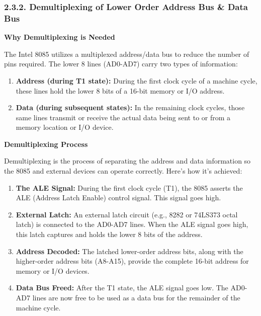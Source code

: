 \documentclass[
]{article}
\begin{document}
\hypertarget{232-demultiplexing-of-lower-order-address-bus--data-bus}{%
\subsubsection{2.3.2. Demultiplexing of Lower Order Address Bus \& Data
Bus}\label{232-demultiplexing-of-lower-order-address-bus--data-bus}}

\textbf{Why Demultiplexing is Needed}

The Intel 8085 utilizes a multiplexed address/data bus to reduce the
number of pins required. The lower 8 lines (AD0-AD7) carry two types of
information:

\begin{enumerate}
\def\labelenumi{\arabic{enumi}.}
\item
  \textbf{Address (during T1 state):} During the first clock cycle of a
  machine cycle, these lines hold the lower 8 bits of a 16-bit memory or
  I/O address.
\item
  \textbf{Data (during subsequent states):} In the remaining clock
  cycles, those same lines transmit or receive the actual data being
  sent to or from a memory location or I/O device.
\end{enumerate}

\textbf{Demultiplexing Process}

Demultiplexing is the process of separating the address and data
information so the 8085 and external devices can operate correctly.
Here's how it's achieved:

\begin{enumerate}
\def\labelenumi{\arabic{enumi}.}
\item
  \textbf{The ALE Signal:} During the first clock cycle (T1), the 8085
  asserts the ALE (Address Latch Enable) control signal. This signal
  goes high.
\item
  \textbf{External Latch:} An external latch circuit (e.g., 8282 or
  74LS373 octal latch) is connected to the AD0-AD7 lines. When the ALE
  signal goes high, this latch captures and holds the lower 8 bits of
  the address.
\item
  \textbf{Address Decoded:} The latched lower-order address bits, along
  with the higher-order address bits (A8-A15), provide the complete
  16-bit address for memory or I/O devices.
\item
  \textbf{Data Bus Freed:} After the T1 state, the ALE signal goes low.
  The AD0-AD7 lines are now free to be used as a data bus for the
  remainder of the machine cycle.
\end{enumerate}
\end{document}
